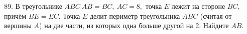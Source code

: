 89. В треугольнике $ABC\ AB=BC,\ AC=8,$ точка $E$ лежит на стороне $BC,$ причём $BE=EC.$ Точка $E$ делит периметр треугольника $ABC$ (считая от вершины $A$) на две части, из которых одна больше другой на 2. Найдите $AB.$\\
